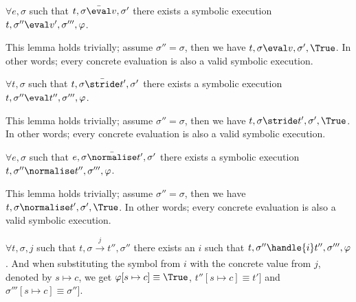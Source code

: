 \begin{lemma}
  $\forall e,\sigma$ such that $t,\sigma \bar{\eval}v,\sigma'$
  there exists a symbolic execution $t,\sigma''\eval v',\sigma''',\phi$.
\end{lemma}

This lemma holds trivially; assume $\sigma''=\sigma$, then we have $t,\sigma\eval v,\sigma',\True$. In other words; every concrete evaluation is also a valid symbolic execution.

\begin{lemma}
  $\forall t,\sigma$ such that $t,\sigma \bar{\stride}t',\sigma'$
  there exists a symbolic execution $t,\sigma''\eval t'',\sigma''',\phi$.
\end{lemma}

This lemma holds trivially; assume $\sigma''=\sigma$, then we have $t,\sigma\stride t',\sigma',\True$. In other words; every concrete evaluation is also a valid symbolic execution.

\begin{lemma}
  $\forall e,\sigma$ such that $e,\sigma \bar{\normalise}t',\sigma'$
  there exists a symbolic execution $t,\sigma''\normalise t'',\sigma''',\phi$.
\end{lemma}

This lemma holds trivially; assume $\sigma''=\sigma$, then we have $t,\sigma\normalise t',\sigma',\True$. In other words; every concrete evaluation is also a valid symbolic execution.

\begin{lemma}
  $\forall t,\sigma,j$ such that $t,\sigma \xrightarrow[]{j} t'',\sigma''$
  there exists an $i$ such that $t,\sigma''\handle{i} t'',\sigma''',\phi$. And when substituting the symbol from $i$ with the concrete value from $j$, denoted by $s\mapsto c$, we get $\phi[s\mapsto c]\equiv\True$, $t''[s\mapsto c]\equiv t']$ and $\sigma'''[s\mapsto c]\equiv\sigma'']$.
\end{lemma}

\begin{lemma}
\end{lemma}
